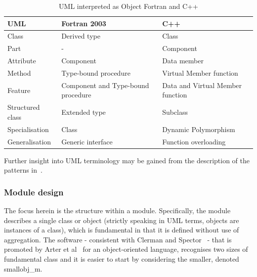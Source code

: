 \begin{table}[tbph]
\begin{center}
\caption{UML interpreted as Object Fortran and C++ \label{tab:TS_umltrans}}
\begin{tabular}{|p{5cm}|p{5cm}|p{5cm}|}
\hline
UML & Fortran 2003 & C++  \\
\hline
Class & Derived type & Class \\
Part  &  - & Component  \\
Attribute & Component & Data member \\
Method & Type-bound procedure & Virtual Member function \\
Feature  & Component and Type-bound procedure & Data and Virtual Member function \\
Structured class & Extended type & Subclass  \\
Specialisation & Class & Dynamic Polymorphism \\
Generalisation & Generic interface & Function overloading \\
\hline
\end{tabular}
Further insight into UML terminology may be gained from the description
of the patterns in~\cite{y2re332,y2re333}.
\end{center}
\end{table}


\subsubsection{Module design}

The focus herein is the structure within a module. Specifically, the module describes a single class or object
(strictly speaking in UML terms, objects are instances of a class), which is
fundamental in that it is defined without use of aggregation.
The software  - consistent with Clerman and Spector~\cite[\S\,11]{clermanspector} -
that is promoted by Arter et al~\cite{fprog} for an object-oriented language, recognises two sizes of fundamental class
and it is easier to start by considering the smaller, denoted smallobj\_m.

